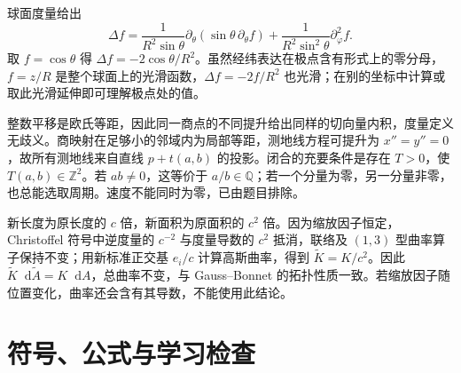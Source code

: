 \documentclass[UTF8,12pt,a4paper,fontset=fandol]{ctexbook}
\newcommand{\dd}{\mathop{}\!\mathrm d}
\begin{document}
\begin{solve}
球面度量给出
\[
 \Delta f=\frac1{R^2\sin\theta}\partial_\theta(\sin\theta\,\partial_\theta f)
 +\frac1{R^2\sin^2\theta}\partial_\varphi^2f.
\]
取 $f=\cos\theta$ 得 $\Delta f=-2\cos\theta/R^2$。虽然经纬表达在极点含有形式上的零分母，$f=z/R$ 是整个球面上的光滑函数，$\Delta f=-2f/R^2$ 也光滑；在别的坐标中计算或取此光滑延伸即可理解极点处的值。
\end{solve}

\begin{solve}
整数平移是欧氏等距，因此同一商点的不同提升给出同样的切向量内积，度量定义无歧义。商映射在足够小的邻域内为局部等距，测地线方程可提升为 $x''=y''=0$，故所有测地线来自直线 $p+t(a,b)$ 的投影。闭合的充要条件是存在 $T>0$，使 $T(a,b)\in\mathbb Z^2$。若 $ab\ne0$，这等价于 $a/b\in\mathbb Q$；若一个分量为零，另一分量非零，也总能选取周期。速度不能同时为零，已由题目排除。
\end{solve}

\begin{solve}
新长度为原长度的 $c$ 倍，新面积为原面积的 $c^2$ 倍。因为缩放因子恒定，Christoffel 符号中逆度量的 $c^{-2}$ 与度量导数的 $c^2$ 抵消，联络及 $(1,3)$ 型曲率算子保持不变；用新标准正交基 $e_i/c$ 计算高斯曲率，得到 $\widetilde K=K/c^2$。因此 $\widetilde K\dd\widetilde A=K\dd A$，总曲率不变，与 Gauss--Bonnet 的拓扑性质一致。若缩放因子随位置变化，曲率还会含有其导数，不能使用此结论。
\end{solve}

\chapter{符号、公式与学习检查}
\label{app:dg-reference}
\end{document}
